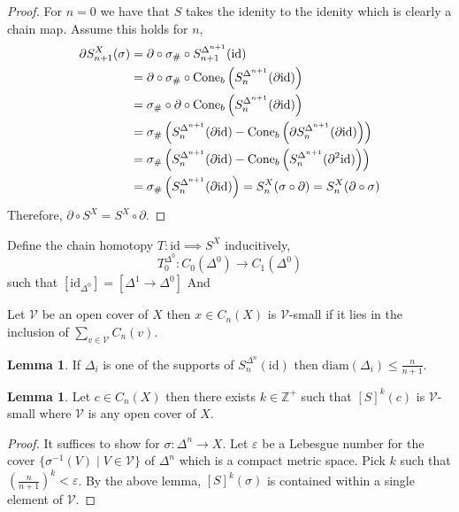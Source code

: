 \documentclass[12pt]{extarticle}
\newcommand{\Zplus}{\mathbb{Z}^{+}}
\newcommand{\id}{\mathrm{id}}
\theoremstyle{definition}
\newtheorem{lemma}[theorem]{Lemma}
\newenvironment{definition}[1][Definition:]{\begin{trivlist}
\item[\hskip \labelsep {\bfseries #1}]}{\end{trivlist}}
\begin{document}
\begin{proof}
For $n = 0$ we have that $S$ takes the idenity to the idenity which is clearly a chain map. Assume this holds for $n$,
\begin{align*}
\partial S_{n+1}^X(\sigma) & = \partial \circ \sigma_{\#} \circ S^{\Delta^{n+1}}_{n+1}(\id)  
\\
& = \partial \circ \sigma_{\#} \circ \cone_b\left( S^{\Delta^{n+1}}_n (\partial \id) \right) 
\\
& = \sigma_{\#} \circ \partial \circ \cone_b\left( S^{\Delta^{n+1}}_n (\partial \id) \right) 
\\
& = \sigma_{\#} \left( S^{\Delta^{n+1}}_n(\partial \id) - \cone_b \left(\partial S^{\Delta^{n+1}}_n (\partial \id) \right) \right)
\\
& = \sigma_{\#} \left( S^{\Delta^{n+1}}_n(\partial \id) - \cone_b \left( S^{\Delta^{n+1}}_n (\partial^2 \id) \right) \right)
\\
& = \sigma_{\#} \left( S^{\Delta^{n+1}}_n(\partial \id) \right) = S_{n}^{X}(\sigma \circ \partial) = S_{n}^{X}(\partial \circ \sigma)
\end{align*}
Therefore, $\partial \circ S^X = S^X \circ \partial$. 
\end{proof}

\begin{definition}
Define the chain homotopy $T : \id \implies S^X$ inducitively,
\[ T_0^{\Delta^0} : C_0(\Delta^0) \to C_1(\Delta^0)\] such that $ [\id_{\Delta^0}] = [\Delta^1 \to \Delta^0] $
And
\end{definition}

\begin{definition}
Let $\mathcal{V}$ be an open cover of $X$ then $x \in C_n(X)$ is $\mathcal{V}$-small if it lies in the inclusion of $\sum_{v \in \mathcal{V}} C_n(v)$.
\end{definition}

\begin{lemma}
If $\Delta_i$ is one of the supports of $S^{\Delta^n}_n(\id)$ then $\mathrm{diam}(\Delta_i) \le \frac{n}{n+1}$.
\end{lemma}

\begin{lemma}
Let $c \in C_n(X)$ then there exists $k \in \Zplus$ such that $[S]^k(c)$ is $\mathcal{V}$-small where $\mathcal{V}$ is any open cover of $X$. 
\end{lemma}

\begin{proof}
It suffices to show for $\sigma : \Delta^n \to X$. Let $\varepsilon$ be a Lebesgue number for the cover $\{ \sigma^{-1}(V) \mid V \in \mathcal{V} \}$ of $\Delta^n$ which is a compact metric space. Pick $k$ such that $\left(\frac{n}{n+1}\right)^k < \varepsilon$. By the above lemma, $[S]^k(\sigma)$ is contained within a single element of $\mathcal{V}$. 
\end{proof}
\end{document}
